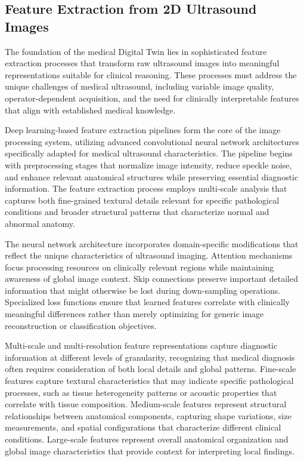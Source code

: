 \subsection{Feature Extraction from 2D Ultrasound Images}

The foundation of the medical Digital Twin lies in sophisticated feature extraction processes that transform raw ultrasound images into meaningful representations suitable for clinical reasoning. These processes must address the unique challenges of medical ultrasound, including variable image quality, operator-dependent acquisition, and the need for clinically interpretable features that align with established medical knowledge.

Deep learning-based feature extraction pipelines form the core of the image processing system, utilizing advanced convolutional neural network architectures specifically adapted for medical ultrasound characteristics. The pipeline begins with preprocessing stages that normalize image intensity, reduce speckle noise, and enhance relevant anatomical structures while preserving essential diagnostic information. The feature extraction process employs multi-scale analysis that captures both fine-grained textural details relevant for specific pathological conditions and broader structural patterns that characterize normal and abnormal anatomy.

The neural network architecture incorporates domain-specific modifications that reflect the unique characteristics of ultrasound imaging. Attention mechanisms focus processing resources on clinically relevant regions while maintaining awareness of global image context. Skip connections preserve important detailed information that might otherwise be lost during down-sampling operations. Specialized loss functions ensure that learned features correlate with clinically meaningful differences rather than merely optimizing for generic image reconstruction or classification objectives.

Multi-scale and multi-resolution feature representations capture diagnostic information at different levels of granularity, recognizing that medical diagnosis often requires consideration of both local details and global patterns. Fine-scale features capture textural characteristics that may indicate specific pathological processes, such as tissue heterogeneity patterns or acoustic properties that correlate with tissue composition. Medium-scale features represent structural relationships between anatomical components, capturing shape variations, size measurements, and spatial configurations that characterize different clinical conditions. Large-scale features represent overall anatomical organization and global image characteristics that provide context for interpreting local findings.

